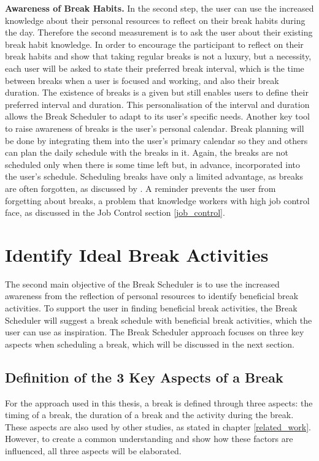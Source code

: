 \documentclass{hasel_thesis}
\begin{document}
\textbf{Awareness of Break Habits.}
In the second step, the user can use the increased knowledge about their personal resources to reflect on their break habits during the day. Therefore the second measurement is to ask the user about their existing break habit knowledge. In order to encourage the participant to reflect on their break habits and show that taking regular breaks is not a luxury, but a necessity, each user will be asked to state their preferred break interval, which is the time between breaks when a user is focused and working, and also their break duration. The existence of breaks is a given but still enables users to define their preferred interval and duration. This personalisation of the interval and duration allows the Break Scheduler to adapt to its user's specific needs. Another key tool to raise awareness of breaks is the user's personal calendar. Break planning will be done by integrating them into the user's primary calendar so they and others can plan the daily schedule with the breaks in it. Again, the breaks are not scheduled only when there is some time left but, in advance, incorporated into the user's schedule. Scheduling breaks have only a limited advantage, as breaks are often forgotten, as discussed by \cite{McLean.2001}. A reminder prevents the user from forgetting about breaks, a problem that knowledge workers with high job control face, as discussed in the Job Control section \ref{job_control}.

\section{Identify Ideal Break Activities}
The second main objective of the Break Scheduler is to use the increased awareness from the reflection of personal resources to identify beneficial break activities. To support the user in finding beneficial break activities, the Break Scheduler will suggest a break schedule with beneficial break activities, which the user can use as inspiration. The Break Scheduler approach focuses on three key aspects when scheduling a break, which will be discussed in the next section.

\subsection{Definition of the 3 Key Aspects of a Break }
For the approach used in this thesis, a break is defined through three aspects: the timing of a break, the duration of a break and the activity during the break. These aspects are also used by other studies, as stated in chapter \ref{related_work}. However, to create a common understanding and show how these factors are influenced, all three aspects will be elaborated.
\end{document}
